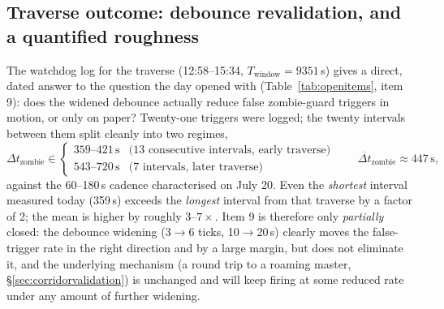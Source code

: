 \subsection{Traverse outcome: debounce revalidation, and a quantified roughness}
\label{sec:traverseoutcome}
The watchdog log for the traverse (12:58--15:34, $T_{\text{window}} =
9351$\,s) gives a direct, dated answer to the question the day opened
with (Table~\ref{tab:openitems}, item 9): does the widened debounce
actually reduce false zombie-guard triggers in motion, or only on paper?
Twenty-one triggers were logged; the twenty intervals between them split
cleanly into two regimes,
\begin{equation}
\Delta t_{\text{zombie}} \in
\begin{cases}
359\text{--}421\,\text{s} & \text{(13 consecutive intervals, early traverse)}\\
543\text{--}720\,\text{s} & \text{(7 intervals, later traverse)}
\end{cases}
\qquad \overline{\Delta t}_{\text{zombie}} \approx 447\,\text{s},
\end{equation}
against the 60--180\,s cadence characterised on July 20. Even the
\emph{shortest} interval measured today (359\,s) exceeds the
\emph{longest} interval from that traverse by a factor of 2; the mean is
higher by roughly $3$--$7\times$. Item 9 is therefore only
\emph{partially} closed: the debounce widening (3$\to$6 ticks,
10$\to$20\,s) clearly moves the false-trigger rate in the right
direction and by a large margin, but does not eliminate it, and the
underlying mechanism (a  round trip to a roaming
master, \S\ref{sec:corridorvalidation}) is unchanged and will keep
firing at some reduced rate under any amount of further widening.

